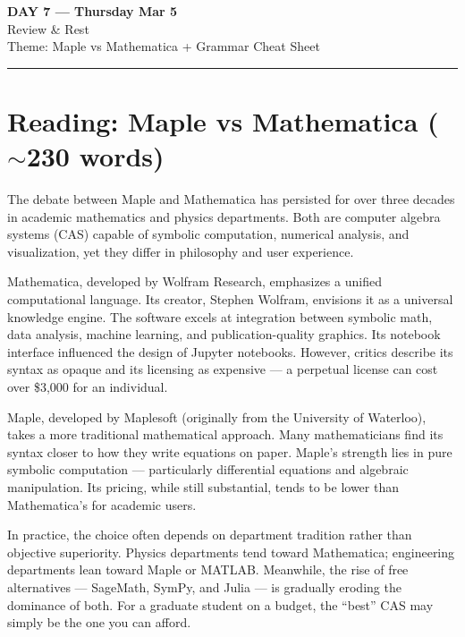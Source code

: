 \documentclass[10pt,a4paper]{article}
\begin{document}
\begin{center}
{\LARGE \textbf{DAY 7 --- Thursday Mar 5}}\\[4pt]
{\large Review \& Rest}\\[2pt]
{\normalsize Theme: Maple vs Mathematica + Grammar Cheat Sheet}\\[2pt]
\rule{\textwidth}{0.8pt}
\end{center}

\section*{Reading: Maple vs Mathematica ($\sim$230 words)}

\begin{tcolorbox}[colback=white, colframe=black]
\small
The debate between Maple and Mathematica has persisted for over three
decades in academic mathematics and physics departments. Both are
computer algebra systems (CAS) capable of symbolic computation,
numerical analysis, and visualization, yet they differ in philosophy
and user experience.

Mathematica, developed by Wolfram Research, emphasizes a unified
computational language. Its creator, Stephen Wolfram, envisions it
as a universal knowledge engine. The software excels at integration
between symbolic math, data analysis, machine learning, and
publication-quality graphics. Its notebook interface influenced the
design of Jupyter notebooks. However, critics describe its syntax as
opaque and its licensing as expensive --- a perpetual license can
cost over \$3,000 for an individual.

Maple, developed by Maplesoft (originally from the University of
Waterloo), takes a more traditional mathematical approach. Many
mathematicians find its syntax closer to how they write equations on
paper. Maple's strength lies in pure symbolic computation ---
particularly differential equations and algebraic manipulation.
Its pricing, while still substantial, tends to be lower than
Mathematica's for academic users.

In practice, the choice often depends on department tradition rather
than objective superiority. Physics departments tend toward
Mathematica; engineering departments lean toward Maple or MATLAB.
Meanwhile, the rise of free alternatives --- SageMath, SymPy, and
Julia --- is gradually eroding the dominance of both. For a graduate
student on a budget, the ``best'' CAS may simply be the one you can
afford.
\end{tcolorbox}
\end{document}
